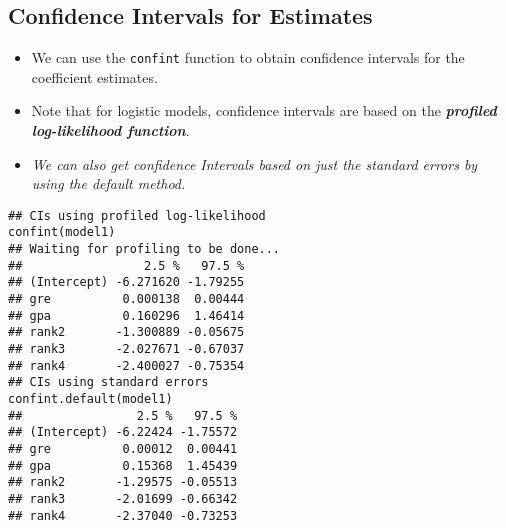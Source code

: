 \documentclass[]{article}
\begin{document}
\subsection{Confidence Intervals for Estimates}
\begin{itemize}

\item We can use the \texttt{confint} function to obtain confidence intervals for the coefficient estimates. 
\item Note that for logistic models, confidence intervals are based on the \textbf{\textit{profiled log-likelihood function}}.
\item\textit{ We can also get confidence Intervals based on just the standard errors by using the default method.}
\end{itemize}
{\Large\begin{framed}
\begin{verbatim}
## CIs using profiled log-likelihood
confint(model1)
## Waiting for profiling to be done...
##                 2.5 %   97.5 %
## (Intercept) -6.271620 -1.79255
## gre          0.000138  0.00444
## gpa          0.160296  1.46414
## rank2       -1.300889 -0.05675
## rank3       -2.027671 -0.67037
## rank4       -2.400027 -0.75354
## CIs using standard errors
confint.default(model1)
##                2.5 %   97.5 %
## (Intercept) -6.22424 -1.75572
## gre          0.00012  0.00441
## gpa          0.15368  1.45439
## rank2       -1.29575 -0.05513
## rank3       -2.01699 -0.66342
## rank4       -2.37040 -0.73253
\end{verbatim}
\end{framed}}
\newpage
\end{document}
